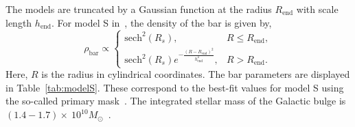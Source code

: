 \documentclass[doublespace,nopageskip]{VTthesis}
\begin{document}
The models are truncated by a Gaussian function at the
radius $R_{\text{end}}$ with scale length $h_{\text{end}}$. For model S in~\citet{1998ApJ...492..495F}, the density of the bar is given by,
\begin{equation}\label{eq:rhobar}
  \rho_{\text{bar}}\propto \begin{cases}
    \text{sech}^2(R_s), & R \leq R_{\text{end}},\\
    \text{sech}^2(R_s)e^{-\frac{(R-R_{\text{end}})^2}{h_{\text{end}}^2}}, &   R > R_{\text{end}}.
  \end{cases}
\end{equation}
{Here, $R$ is the radius in cylindrical coordinates.}
The bar parameters 
are displayed in Table~\ref{tab:modelS}. These correspond to the best-fit values for model S using the so-called primary mask~\cite{1998ApJ...492..495F}. The integrated stellar mass of the Galactic bulge is $(1.4-1.7)\times\ 10^{10} M_\odot$~\cite{2016ARA&A..54..529B}.

\end{document}
